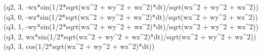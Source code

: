 \documentclass[]{article}
\newenvironment{Shaded}{}{}
\newcommand{\DecValTok}[1]{\textcolor[rgb]{0.25,0.63,0.44}{#1}}
\newcommand{\OperatorTok}[1]{\textcolor[rgb]{0.40,0.40,0.40}{#1}}
\newcommand{\NormalTok}[1]{#1}
\begin{document}
\begin{Shaded}
\begin{Highlighting}[]
\NormalTok{(q2, }\DecValTok{3}\NormalTok{, }\OperatorTok{-}\NormalTok{wx}\OperatorTok{*}\NormalTok{sin(}\DecValTok{1}\OperatorTok{/}\DecValTok{2}\OperatorTok{*}\NormalTok{sqrt(wx}\OperatorTok{^}\DecValTok{2} \OperatorTok{+}\NormalTok{ wy}\OperatorTok{^}\DecValTok{2} \OperatorTok{+}\NormalTok{ wz}\OperatorTok{^}\DecValTok{2}\NormalTok{)}\OperatorTok{*}\NormalTok{dt)}\OperatorTok{/}\NormalTok{sqrt(wx}\OperatorTok{^}\DecValTok{2} \OperatorTok{+}\NormalTok{ wy}\OperatorTok{^}\DecValTok{2} \OperatorTok{+}\NormalTok{ wz}\OperatorTok{^}\DecValTok{2}\NormalTok{))}
\NormalTok{(q3, }\DecValTok{0}\NormalTok{, }\OperatorTok{-}\NormalTok{wz}\OperatorTok{*}\NormalTok{sin(}\DecValTok{1}\OperatorTok{/}\DecValTok{2}\OperatorTok{*}\NormalTok{sqrt(wx}\OperatorTok{^}\DecValTok{2} \OperatorTok{+}\NormalTok{ wy}\OperatorTok{^}\DecValTok{2} \OperatorTok{+}\NormalTok{ wz}\OperatorTok{^}\DecValTok{2}\NormalTok{)}\OperatorTok{*}\NormalTok{dt)}\OperatorTok{/}\NormalTok{sqrt(wx}\OperatorTok{^}\DecValTok{2} \OperatorTok{+}\NormalTok{ wy}\OperatorTok{^}\DecValTok{2} \OperatorTok{+}\NormalTok{ wz}\OperatorTok{^}\DecValTok{2}\NormalTok{))}
\NormalTok{(q3, }\DecValTok{1}\NormalTok{, }\OperatorTok{-}\NormalTok{wy}\OperatorTok{*}\NormalTok{sin(}\DecValTok{1}\OperatorTok{/}\DecValTok{2}\OperatorTok{*}\NormalTok{sqrt(wx}\OperatorTok{^}\DecValTok{2} \OperatorTok{+}\NormalTok{ wy}\OperatorTok{^}\DecValTok{2} \OperatorTok{+}\NormalTok{ wz}\OperatorTok{^}\DecValTok{2}\NormalTok{)}\OperatorTok{*}\NormalTok{dt)}\OperatorTok{/}\NormalTok{sqrt(wx}\OperatorTok{^}\DecValTok{2} \OperatorTok{+}\NormalTok{ wy}\OperatorTok{^}\DecValTok{2} \OperatorTok{+}\NormalTok{ wz}\OperatorTok{^}\DecValTok{2}\NormalTok{))}
\NormalTok{(q3, }\DecValTok{2}\NormalTok{, wx}\OperatorTok{*}\NormalTok{sin(}\DecValTok{1}\OperatorTok{/}\DecValTok{2}\OperatorTok{*}\NormalTok{sqrt(wx}\OperatorTok{^}\DecValTok{2} \OperatorTok{+}\NormalTok{ wy}\OperatorTok{^}\DecValTok{2} \OperatorTok{+}\NormalTok{ wz}\OperatorTok{^}\DecValTok{2}\NormalTok{)}\OperatorTok{*}\NormalTok{dt)}\OperatorTok{/}\NormalTok{sqrt(wx}\OperatorTok{^}\DecValTok{2} \OperatorTok{+}\NormalTok{ wy}\OperatorTok{^}\DecValTok{2} \OperatorTok{+}\NormalTok{ wz}\OperatorTok{^}\DecValTok{2}\NormalTok{))}
\NormalTok{(q3, }\DecValTok{3}\NormalTok{, cos(}\DecValTok{1}\OperatorTok{/}\DecValTok{2}\OperatorTok{*}\NormalTok{sqrt(wx}\OperatorTok{^}\DecValTok{2} \OperatorTok{+}\NormalTok{ wy}\OperatorTok{^}\DecValTok{2} \OperatorTok{+}\NormalTok{ wz}\OperatorTok{^}\DecValTok{2}\NormalTok{)}\OperatorTok{*}\NormalTok{dt))}
\end{Highlighting}
\end{Shaded}
\end{document}
